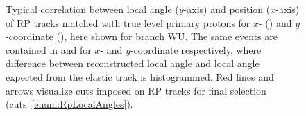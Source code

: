 \begin{figure}[h]
{}%
\label{fig:localAngleRp}%
\caption[Local angle vs. position of RP tracks matched with true level primary protons.]{Typical correlation between local angle ($y$-axis) and position ($x$-axis) of RP tracks matched with true level primary protons for $x$- () and $y$-coordinate (), here shown for branch WU. The same events are contained in  and  for $x$- and $y$-coordinate respectively, where difference between reconstructed local angle and local angle expected from the elastic track is histogrammed. Red lines and arrows visualize cuts imposed on RP tracks for final selection (cuts~\ref{enum:RpLocalAngles}).}
\end{figure}







